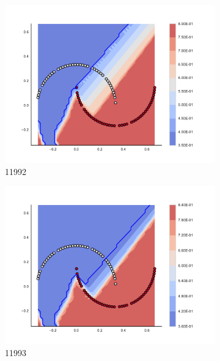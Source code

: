 \begin{figure}[h]
\begin{subfigure}[b]{0.09\textwidth}
    \includegraphics[clip, trim=2.35cm 1.75cm 4.5cm 0cm,width=\textwidth]{img/convergence/11992.pdf}
    \caption{11992}
    \label{fig:convergence_11992}
\end{subfigure}
%
\begin{subfigure}[b]{0.09\textwidth}
    \includegraphics[clip, trim=2.35cm 1.75cm 4.5cm 0cm,width=\textwidth]{img/convergence/11993.pdf}
    \caption{11993}
    \label{fig:convergence_11993}
\end{subfigure}
%
\begin{subfigure}[b]{0.09\textwidth}

\end{subfigure}
\end{figure}
